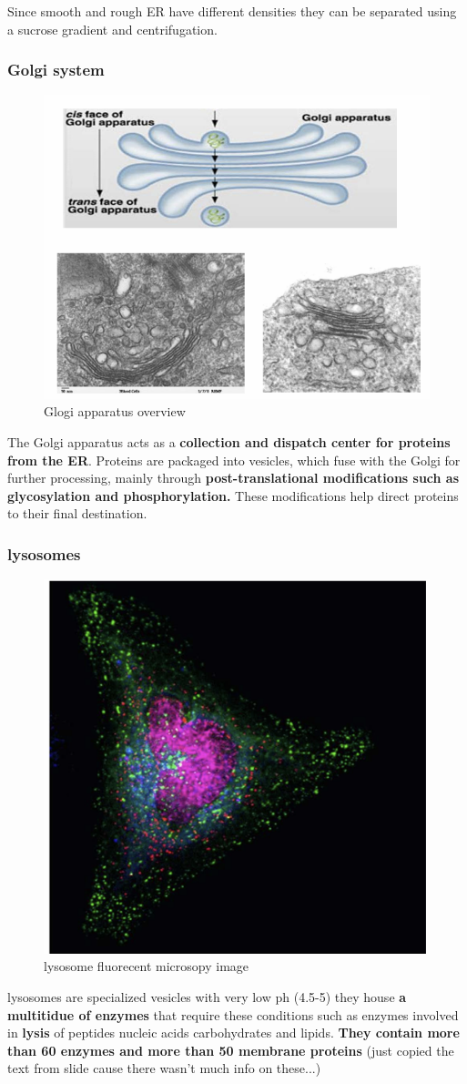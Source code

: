 \documentclass[../main.tex]{subfiles}
\begin{document}
Since smooth and rough ER have different densities they can be separated using a sucrose gradient and centrifugation.



\subsubsection{Golgi system}
\begin{figure}[H]
    \centering
    \includegraphics[width=0.5\linewidth]{Golgi.png}
    \caption{Glogi apparatus overview}
    \label{fig:enter-label}
\end{figure}

The Golgi apparatus acts as a \textbf{collection and dispatch center for proteins from the ER}. Proteins are packaged into vesicles, which fuse with the Golgi for further processing, mainly through\textbf{ post-translational modifications such as glycosylation and phosphorylation.} These modifications help direct proteins to their final destination.


\subsubsection{lysosomes}
\begin{figure}[H]
    \centering
    \includegraphics[width=0.5\linewidth]{lysosome.png}
    \caption{lysosome fluorecent microsopy image}
    \label{fig:enter-label}
\end{figure}
lysosomes are specialized vesicles with very low ph (4.5-5) they house \textbf{a multitidue of enzymes} that require these conditions such as enzymes involved in\textbf{ lysis} of peptides nucleic acids carbohydrates and lipids. \textbf{They contain more than 60 enzymes and more than 50 membrane proteins}
(just copied the text from slide cause there wasn't much info on these...)
\end{document}
